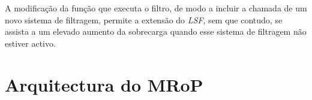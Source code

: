 A modificação da função que executa o filtro, de modo a incluir a chamada de um novo sistema de filtragem, permite a extensão do \textit{LSF}, sem que contudo, se assista a um elevado aumento da sobrecarga quando esse sistema de filtragem não estiver activo.






\section{Arquitectura do MRoP}
\label{sec:mrop_architecture}

